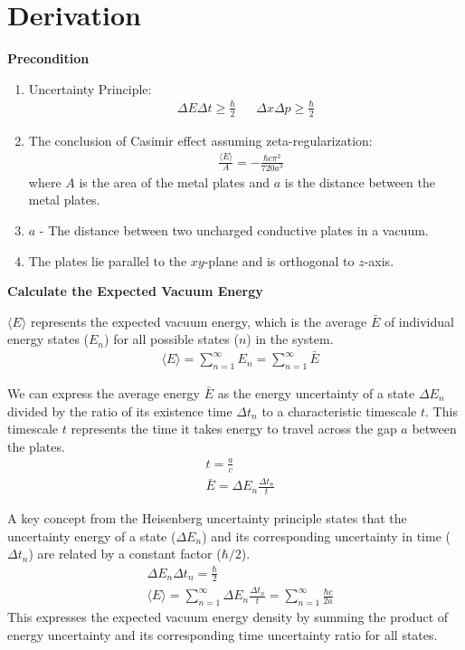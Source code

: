 \section{Derivation}

\noindent\textbf{Precondition}


\begin{enumerate}
    \item Uncertainty Principle\citep*{heisenberg1930physical}:
        \begin{align}
            &\Delta E \Delta t \ge \frac{\hbar}{2}& 
            &\Delta x \Delta p \ge \frac{\hbar}{2}&
        \end{align}
    \item The conclusion of Casimir effect assuming zeta-regularization\citep*{Casimir:1948dh}: 
    \begin{align}&\frac{\langle E \rangle}{A} = -\frac{\hbar c \pi^2}{720 a^3}\end{align}
    where \(A\) is the area of the metal plates and $a$ is the distance between the metal plates.
    \item $a$ - The distance between two uncharged conductive plates in a vacuum.
    \item The plates lie parallel to the \(xy\)-plane and is orthogonal to \(z\)-axis.
\end{enumerate}

\noindent\textbf{Calculate the Expected Vacuum Energy}


$\langle E \rangle$ represents the expected vacuum energy, 
which is the average $\bar E$ of individual energy states ($E_n$) for all possible states ($n$) in the system.
\begin{align}
    &\langle E \rangle = \sum_{n=1}^{\infty}E_n = \sum_{n=1}^{\infty}\bar{E}
\end{align}

We can express the average energy $\bar E$ as the energy uncertainty of 
a state $\Delta E_n$ divided by the ratio of its existence time $\Delta t_n$ 
to a characteristic timescale $t$.
This timescale $t$ represents the time it takes energy to travel across the gap $a$ between the plates.
\begin{align}
    &t = \frac{a}{c} \\
    &\bar{E} = \Delta E_n\frac{\Delta t_n}{t}
\end{align}

A key concept from the Heisenberg uncertainty principle states that 
the uncertainty energy of a state ($\Delta E_n$) and its corresponding uncertainty in time ($\Delta t_n$) are 
related by a constant factor ($\hbar/2$).
\begin{align}
    &\Delta E_n \Delta t_n = \frac{\hbar}{2}\\
    &\langle E \rangle = \sum_{n=1}^{\infty} \Delta E_n \frac{\Delta t_n}{t} = \sum_{n=1}^{\infty} \frac{\hbar c }{2 a}
\end{align}
This expresses the expected vacuum energy density by summing 
the product of energy uncertainty and its corresponding time uncertainty ratio for all states.

